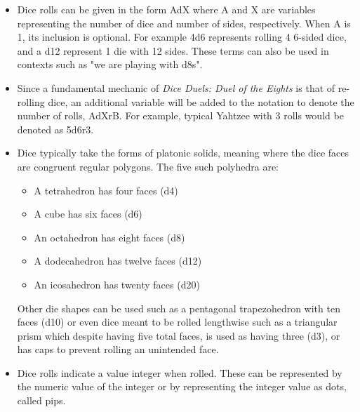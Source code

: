 \begin{itemize}

\item Dice rolls can be given in the form AdX where A and X are variables representing the number of dice and number of sides, respectively. When A is 1, its inclusion is optional. For example 4d6 represents rolling 4 6-sided dice, and a d12 represent 1 die with 12 sides. These terms can also be used in contexts such as "we are playing with d8s".

\item Since a fundamental mechanic of \textit{Dice Duels: Duel of the Eights} is that of re-rolling dice, an additional variable will be added to the notation to denote the number of rolls, AdXrB. For example, typical Yahtzee with 3 rolls would be denoted as 5d6r3.

\item Dice typically take the forms of platonic solids, meaning where the dice faces are congruent regular polygons. The five such polyhedra are:
\begin{itemize}
	\item A tetrahedron has four faces (d4)
	\item A cube has six faces (d6)
	\item An octahedron has eight faces (d8)
	\item A dodecahedron has twelve faces (d12)
	\item An icosahedron has twenty faces (d20)
\end{itemize}
Other die shapes can be used such as a pentagonal trapezohedron with ten faces (d10) or even dice meant to be rolled lengthwise such as a triangular prism which despite having five total faces, is used as having three (d3), or has caps to prevent rolling an unintended face.

\item Dice rolls indicate a value integer when rolled. These can be represented by the numeric value of the integer or by representing the integer value as dots, called pips.


\end{itemize}
